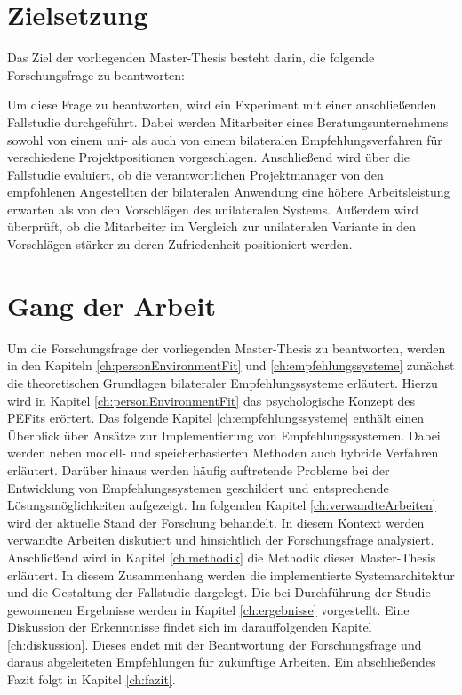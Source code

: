 \newpage
\section{Zielsetzung}
\label{sec:intro:zielsetzung}
Das Ziel der vorliegenden Master-Thesis besteht darin, die folgende Forschungsfrage zu beantworten:

\forschungsfrage

Um diese Frage zu beantworten, wird ein Experiment mit einer anschließenden Fallstudie durchgeführt. Dabei werden Mitarbeiter eines Beratungsunternehmens sowohl von einem uni- als auch von einem bilateralen Empfehlungsverfahren für verschiedene Projektpositionen vorgeschlagen. Anschließend wird über die Fallstudie evaluiert, ob die verantwortlichen Projektmanager von den empfohlenen Angestellten der bilateralen Anwendung eine höhere Arbeitsleistung erwarten als von den Vorschlägen des unilateralen Systems. Außerdem wird überprüft, ob die Mitarbeiter im Vergleich zur unilateralen Variante in den Vorschlägen stärker zu deren Zufriedenheit positioniert werden.

\section{Gang der Arbeit}
\label{sec:intro:gangDerArbeit}
Um die Forschungsfrage der vorliegenden Master-Thesis zu beantworten, werden in den Kapiteln \ref{ch:personEnvironmentFit} und \ref{ch:empfehlungssysteme} zunächst die theoretischen Grundlagen bilateraler Empfehlungssysteme erläutert. Hierzu wird in Kapitel \ref{ch:personEnvironmentFit} das psychologische Konzept des \acp{PEFit} erörtert. Das folgende Kapitel \ref{ch:empfehlungssysteme} enthält einen Überblick über Ansätze zur Implementierung von Empfehlungssystemen. Dabei werden neben modell- und speicherbasierten Methoden auch hybride Verfahren erläutert. Darüber hinaus werden häufig auftretende Probleme bei der Entwicklung von Empfehlungssystemen geschildert und entsprechende Lösungsmöglichkeiten aufgezeigt. Im folgenden Kapitel \ref{ch:verwandteArbeiten} wird der aktuelle Stand der Forschung behandelt. In diesem Kontext werden verwandte Arbeiten diskutiert und hinsichtlich der Forschungsfrage analysiert. Anschließend wird in Kapitel \ref{ch:methodik} die Methodik dieser Master-Thesis erläutert. In diesem Zusammenhang werden die implementierte Systemarchitektur und die Gestaltung der Fallstudie dargelegt. Die bei Durchführung der Studie gewonnenen Ergebnisse werden in Kapitel \ref{ch:ergebnisse} vorgestellt. Eine Diskussion der Erkenntnisse findet sich im darauffolgenden Kapitel \ref{ch:diskussion}. Dieses endet mit der Beantwortung der Forschungsfrage und daraus abgeleiteten Empfehlungen für zukünftige Arbeiten. Ein abschließendes Fazit folgt in Kapitel \ref{ch:fazit}.
